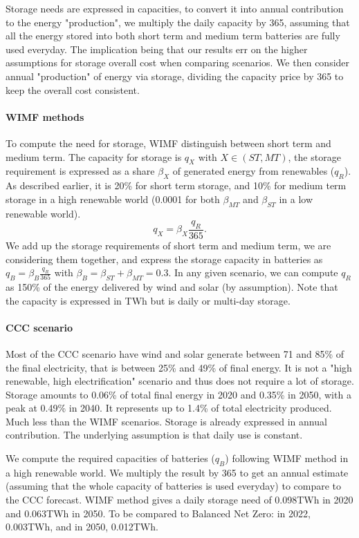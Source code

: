 Storage needs are expressed in capacities, to convert it into annual contribution to the energy "production", we multiply the daily capacity by 365, assuming that all the energy stored into both short term and medium term batteries are fully used everyday. The implication being that our results err on the higher assumptions for storage overall cost when comparing scenarios. We then consider annual "production" of energy via storage, dividing the capacity price by 365 to keep the overall cost consistent. 

\paragraph{WIMF methods} To compute the need for storage, WIMF distinguish between short term and medium term. The capacity for storage is $q_X$ with $X\in (ST,MT)$, the storage requirement is expressed as a share $\beta_X$ of generated energy from renewables ($q_R$). As described earlier, it is 20\% for short term storage, and 10\% for medium term storage in a high renewable world (0.0001 for both $\beta_{MT}$ and $\beta_{ST}$ in a low renewable world).  
\[q_{X}=\beta_X \frac{q_R}{365}.\] 
We add up the storage requirements of short term and medium term, we are considering them together, and express the storage capacity in batteries as $q_B= \beta_B\frac{q_R}{365}$ with $\beta_B=\beta_{ST}+\beta_{MT}=0.3$. In any given scenario, we can compute $q_R$ as 150\% of the energy delivered by wind and solar (by assumption). Note that the capacity is expressed in TWh but is daily or multi-day storage.



\paragraph{CCC scenario} Most of the CCC scenario have wind and solar generate between 71 and 85\% of the final electricity, that is between 25\% and 49\% of final energy. It is not a "high renewable, high electrification" scenario and thus does not require a lot of storage. Storage amounts to 0.06\% of total final energy in 2020 and 0.35\% in 2050, with a peak at 0.49\% in 2040. It represents up to 1.4\% of total electricity produced. Much less than the WIMF scenarios. Storage is already expressed in annual contribution. The underlying assumption is that daily use is constant. 

We compute the required capacities of batteries ($q_B$) following WIMF method in a high renewable world. We multiply the result by 365 to get an annual estimate (assuming that the whole capacity of batteries is used everyday) to compare to the CCC forecast. WIMF method gives a daily storage need of 0.098TWh in 2020 and 0.063TWh in 2050. To be compared to Balanced Net Zero: in 2022,  0.003TWh, and in 2050, 0.012TWh.


